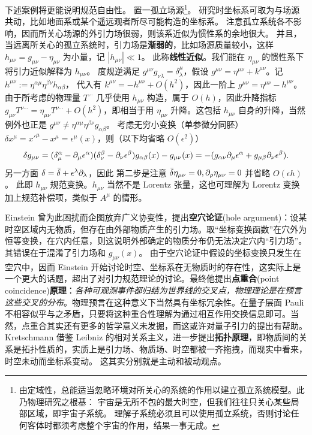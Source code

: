 下述案例将更能说明规范自由性。
置一孤立场源\footnote{由定域性，总能适当忽略环境对所关心的系统的作用以建立孤立系统模型。此乃物理研究之根基：
宇宙是无所不包的最大时空，但我们往往只关心某些局部区域，即宇宙子系统。
理解子系统必须且可以使用孤立系统，否则讨论任何客体时都须考虑整个宇宙的作用，结果一事无成。}。
研究时坐标系可取为与场源共动，比如地面系或某个遥远观者所尽可能构造的坐标系。
注意孤立系统各不影响，因而所关心场源的外引力场很弱，则该系近似为惯性系的余地很大。
并且，当远离所关心的孤立系统时，引力场是\textbf{渐弱的}，比如场源质量较小，这样 $h_{\mu\nu}=g_{\mu\nu}-\eta_{\mu\nu}$ 为小量，记 $|h_{\mu\nu}|\ll 1$。
此称\textbf{线性近似}。我们能在 $\eta_{\mu\nu}$ 的惯性系下将引力近似解释为 $h_{\mu\nu}$。
度规逆满足 $g^{\mu\nu}g_{\nu\lambda}=\delta^\mu_\lambda$，假设 $g^{\mu\nu} = \eta^{\mu\nu} + k^{\mu\nu}$。记 $h^{\mu\nu} := \eta^{\alpha\mu}\eta^{\beta\nu}h_{\alpha\beta}$，
代入有 $k^{\mu\nu} = -h^{\mu\nu} + O(h^2)$，因此一阶上 $g^{\mu\nu} = \eta^{\mu\nu} - h^{\mu\nu}$。由于所考虑的物理量 $T^{\cdots}$ 几乎使用 $h_{\mu\nu}$ 构造，属于 $O(h)$，因此升降指标 $g_{\mu\nu} T^{\nu\cdots} = \eta_{\mu\nu} T^{\nu\cdots} + O(h^2)$，即相当于用 $\eta_{\mu\nu}$ 升降。这包括 $h_{\mu\nu}$ 自身的升降，当然例外也正是 $g^{\mu\nu} \ne \eta^{\alpha\mu}\eta^{\beta\nu}g_{\alpha\beta}$。
考虑无穷小变换（单参微分同胚） $\delta x^\mu=x'^\mu-x^\mu=\epsilon^\mu(x)$，则（以下均省略 $O(\epsilon^2)$）
\[\delta g_{\mu\nu} = (\delta^\alpha_\mu - \partial_\mu \epsilon^\alpha)(\delta^\beta_\nu - \partial_\nu \epsilon^\beta) g_{\alpha\beta}(x) - g_{\mu\nu}(x) = - (g_{\alpha\nu} \partial_\mu \epsilon^\alpha + g_{\mu\beta} \partial_\nu \epsilon^\beta).\]
另一方面 $\delta = \bar\var + \epsilon^\lambda\partial_\lambda$，因此
第二步是注意 $\bar\var\eta_{\mu\nu}=0,\partial_\rho \eta_{\mu\nu} = 0$ 并省略 $O(\epsilon h)$。
此即 $h_{\mu\nu}$ 规范变换。$h_{\mu\nu}$ 当然不是 Lorentz 张量，这也可理解为 Lorentz 变换加上规范补偿项，类似于 $A^\mu$ 的情形。

Einstein 曾为此困扰而企图放弃广义协变性，提出\textbf{空穴论证}(hole argument)：设某时空区域内无物质，但存在由外部物质产生的引力场。取“坐标变换函数”在穴外为恒等变换，在穴内任意，则这说明外部确定的物质分布仍无法决定穴内“引力场”。其错误在于混淆了引力场和 $g_{\mu\nu}(x)$。
由于空穴论证中假设的坐标变换只发生在空穴中，因而 Einstein 开始讨论时空、坐标系在无物质时的存在性，这实际上是一个更大的话题，超出了对引力规范理论的讨论。最终他提出\textbf{点重合}(point coincidence)\textbf{原理}：\emph{各种可观测事件都归结为世界线的交叉点，物理理论是在预言这些交叉的分布}。物理预言在这种意义下当然具有坐标冗余性。在量子层面 Pauli 不相容似乎与之矛盾，只要将这种重合性理解为通过相互作用交换信息即可。当然，点重合其实还有更多的哲学意义未发掘，而这或许对量子引力的提出有帮助。
Kretschmann 借鉴 Leibniz 的相对关系主义，进一步提出\textbf{拓扑原理}，即物质间的关系是拓扑性质的，实质上是引力场、物质场、时空都被一齐拖拽，而现实中看来，时空未动而坐标系变动。
这其实分别就是主动和被动观点。

